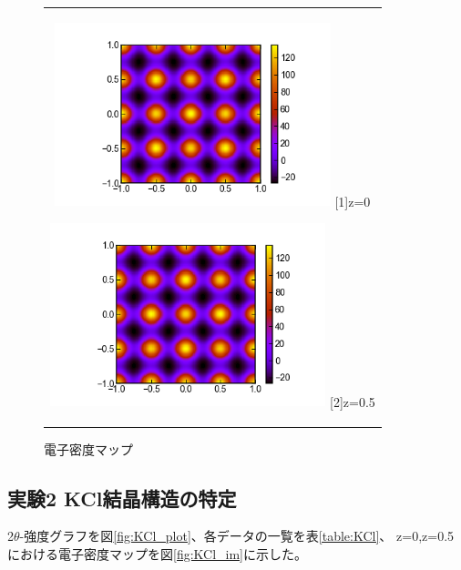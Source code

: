 \documentclass[a4paper,12pt]{jarticle}
\begin{document}
     \begin{figure}[htbp]
      \begin{center}
       \begin{tabular}{c}
       
       \begin{minipage}{0.5\hsize}
        \begin{center}
         \includegraphics[clip,width=8cm]{NaCL_im00.png}
         \label{fig:NaCl_im00}
         \hspace{1.6cm} [1]z=0
        \end{center}
       \end{minipage}
       
       \begin{minipage}{0.5\hsize}
        \begin{center}
         \includegraphics[clip,width=8cm]{NaCL_im05.png}
         \label{fig:NaCl_im05}
         \hspace{1.6cm} [2]z=0.5
        \end{center}
       \end{minipage}
       
      \end{tabular} 
      \caption{電子密度マップ}
      \label{fig:NaCl_im}
      \end{center}
     \end{figure}  
        
  \subsection{実験2 KCl結晶構造の特定}
   2$\theta$-強度グラフを図\ref{fig:KCl_plot}、各データの一覧を表\ref{table:KCl}、
   z=0,z=0.5における電子密度マップを図\ref{fig:KCl_im}に示した。
\end{document}
